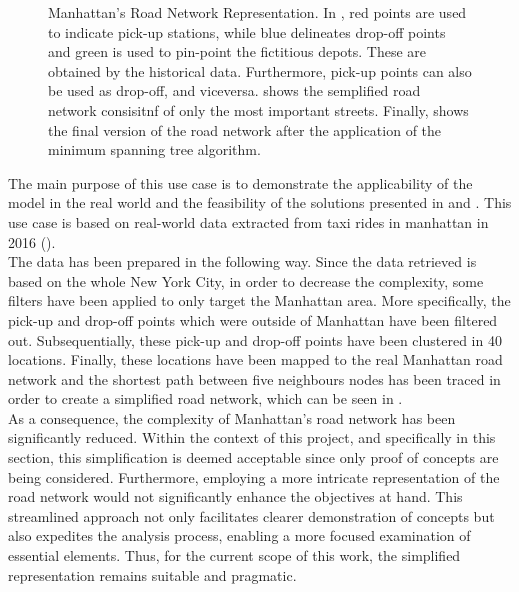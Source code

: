 \begin{figure}[tbh]
	\caption[Manhattan's Road Network Representation]{Manhattan's Road Network Representation. In , red points are used to indicate pick-up stations, while blue delineates drop-off points and green is used to pin-point the fictitious depots. These are obtained by the historical data. Furthermore, pick-up points can also be used as drop-off, and viceversa.  shows the semplified road network consisitnf of only the most important streets. Finally,  shows the final version of the road network after the application of the minimum spanning tree algorithm.  }
	\label{fig:nyc_rn}
\end{figure}
The main purpose of this use case is to demonstrate the applicability of the model in the real world and the feasibility of the solutions presented in  and . This use case is based on real-world data extracted from taxi rides in manhattan in 2016 (\cite{Donovan2014}). \\
The data has been prepared in the following way. Since the data retrieved is based on the whole New York City, in order to decrease the complexity, some filters have been applied to only target the Manhattan area. More specifically, the pick-up and drop-off points which were outside of Manhattan have been filtered out. Subsequentially, these pick-up and drop-off points have been clustered in 40 locations. Finally, these locations have been mapped to the real Manhattan road network and the shortest path between five neighbours nodes has been traced in order to create a simplified road network, which can be seen in . \\
As a consequence, the complexity of Manhattan's road network has been significantly reduced. Within the context of this project, and specifically in this section, this simplification is deemed acceptable since only proof of concepts are being considered. Furthermore, employing a more intricate representation of the road network would not significantly enhance the objectives at hand. This streamlined approach not only facilitates clearer demonstration of concepts but also expedites the analysis process, enabling a more focused examination of essential elements. Thus, for the current scope of this work, the simplified representation remains suitable and pragmatic.

